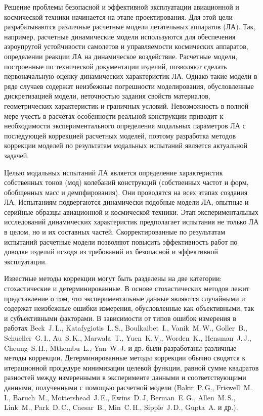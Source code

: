 
{\actuality} 

Решение проблемы безопасной и эффективной эксплуатации авиационной и космической техники начинается на этапе проектирования. Для этой цели разрабатываются различные расчетные модели летательных аппаратов (ЛА). Так, например, расчетные динамические модели используются для обеспечения аэроупругой устойчивости самолетов и управляемости космических аппаратов, определении реакции ЛА на динамическое воздействие. Расчетные модели, построенные по технической документации изделий, позволяют сделать первоначальную оценку динамических характеристик ЛА. Однако такие модели в ряде случаев содержат неизбежные погрешности моделирования, обусловленные дискретизацией модели, неточностью задания свойств материалов, геометрических характеристик и граничных условий. Невозможность в полной мере учесть в расчетах особенности реальной конструкции приводит к необходимости экспериментального определения модальных параметров ЛА с последующей коррекцией расчетных моделей, поэтому разработка методов коррекции моделей по результатам модальных испытаний является актуальной задачей.

Целью модальных испытаний ЛА является определение характеристик собственных тонов (мод) колебаний конструкций (собственных частот и форм, обобщенных масс и демпфирования). Они проводятся на всех этапах создания ЛА. Испытаниям подвергаются динамически подобные модели ЛА, опытные и серийные образцы авиационной и космической техники. Этап экспериментальных исследований динамических характеристик предполагает испытания не только ЛА в целом, но и их составных частей. Скорректированные по результатам испытаний расчетные модели позволяют повысить эффективность работ по доводке изделий исходя из требований их безопасной и эффективной эксплуатации. 

{\progress}

Известные методы коррекции могут быть разделены на две категории: стохастические и детерминированные. В основе стохастических методов лежит представление о том, что экспериментальные данные являются случайными и содержат неизбежные ошибки измерения, обусловленные как объективными, так и субъективными факторами. В зависимости от типов ошибок измерения в работах Beck~J.\,L., Katafygiotis~L.\,S., Boulkaibet~I., Vanik~M.\,W., Goller~B., Schueller~G.\,I., Au~S.\,K., Marwala~T., Yuen~K.\,V., Worden~K., Hensman~J.\,J., Cheung~S.\,H., Mthembu~L., Yan~W.\,J. и др. были разработаны различные методы коррекции. Детерминированные методы коррекции обычно сводятся к итерационной процедуре минимизации целевой функции, равной сумме квадратов разностей между измеренными в эксперименте данными и соответствующими данными, полученными с помощью расчетной модели (Bakir~P.\,G., Friswell~M.\,I., Baruch~M., Mottershead~J.\,E., Ewins~D.\,J, Berman~E.\,G., Allen~M.\,S., Link~M., Park~D.\,C., Caesar~B., Min~C.\,H., Sipple~J.\,D., Gupta~A. и др.).

